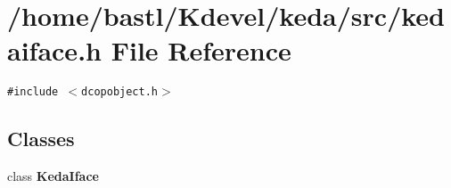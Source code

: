 \section{/home/bastl/Kdevel/keda/src/kedaiface.h File Reference}
\label{kedaiface_8h}
{\tt \#include $<$dcopobject.h$>$}\par
\subsection*{Classes}
\begin{CompactItemize}
\item 
class {\bf Keda\-Iface}
\end{CompactItemize}
